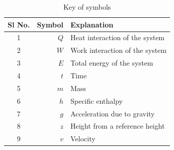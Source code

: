 \begin{table}[h!]

\begin{center}

	\caption{Key of symbols}
	
	\begin{tabular}{|c|r|l|}

\hline
	Sl No. & Symbol & Explanation \\
	\hline
	1 & $Q$ & Heat interaction of the system \\
	2 & $W$ & Work interaction of the system \\
	3 & $E$ & Total energy of the system \\
	4 & $t$ & Time \\
	5 & $m$ & Mass \\
	6 & $h$ & Specific enthalpy \\
	7 & $g$ & Acceleration due to gravity \\
	8 & $z$ & Height from a reference height \\
	9 & $v$ & Velocity \\
	\hline

\end{tabular}

\end{center}

\end{table}